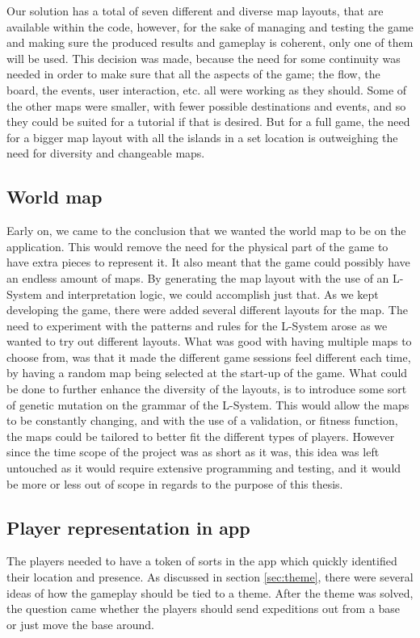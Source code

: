 Our solution has a total of seven different and diverse map layouts, that are available within the code, however, for the sake of managing and testing the game and making sure the produced results and gameplay is coherent, only one of them will be used. This decision was made, because the need for some continuity was needed in order to make sure that all the aspects of the game; the flow, the board, the events, user interaction, etc. all were working as they should. 
Some of the other maps were smaller, with fewer possible destinations and events, and so they could be suited for a tutorial if that is desired. But for a full game, the need for a bigger map layout with all the islands in a set location is outweighing the need for diversity and changeable maps.

\subsection{World map}
Early on, we came to the conclusion that we wanted the world map to be on the application. This would remove the need for the physical part of the game to have extra pieces to represent it. It also meant that the game could possibly have an endless amount of maps. By generating the map layout with the use of an L-System and interpretation logic, we could accomplish just that. As we kept developing the game, there were added several different layouts for the map. The need to experiment with the patterns and rules for the L-System arose as we wanted to try out different layouts. What was good with having multiple maps to choose from, was that it made the different game sessions feel different each time, by having a random map being selected at the start-up of the game. What could be done to further enhance the diversity of the layouts, is to introduce some sort of genetic mutation on the grammar of the L-System. This would allow the maps to be constantly changing, and with the use of a validation, or fitness function, the maps could be tailored to better fit the different types of players. However since the time scope of the project was as short as it was, this idea was left untouched as it would require extensive programming and testing, and it would be more or less out of scope in regards to the purpose of this thesis.

\subsection{Player representation in app}
The players needed to have a token of sorts in the app which quickly identified their location and presence.
As discussed in section \ref{sec:theme}, there were several ideas of how the gameplay should be tied to a theme. After the theme was solved, the question came whether the players should send expeditions out from a base or just move the base around.

